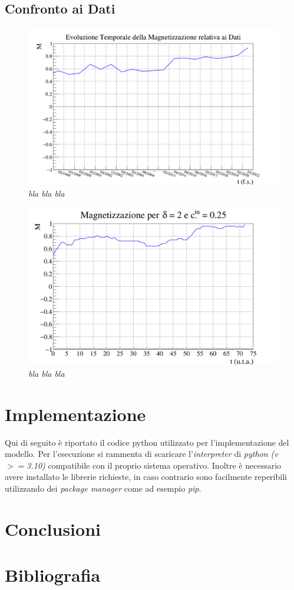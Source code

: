 \documentclass{article}
\begin{document}
\subsection{Confronto ai Dati}
\label{Sec:4.5}

\begin{figure}[h]
\centering
\includegraphics[width = 1.1\linewidth]{poland_magnetization_graph.png}
\caption{\textit{bla bla bla}}
\label{Fig:9}
\end{figure}

\begin{figure}[h]
\centering
\includegraphics[width = 1.1\linewidth]{poland_sim_magnetization_graph.png}
\caption{\textit{bla bla bla}}
\label{Fig:9}
\end{figure}

\section{Implementazione}
\label{Sec:5}
Qui di seguito è riportato il codice python utilizzato per l'implementazione del modello. Per l'esecuzione si rammenta di scaricare l'\textit{interpreter} di \textit{python (v ${>=}$3.10)} compatibile con il proprio sistema operativo. Inoltre è necessario avere installato le librerie richieste, in caso contrario sono facilmente reperibili utilizzando dei \textit{package manager} come ad esempio \textit{pip}.

\section{Conclusioni}
\label{Sec:6}

\section{Bibliografia}
\label{Sec:7}
\end{document}
